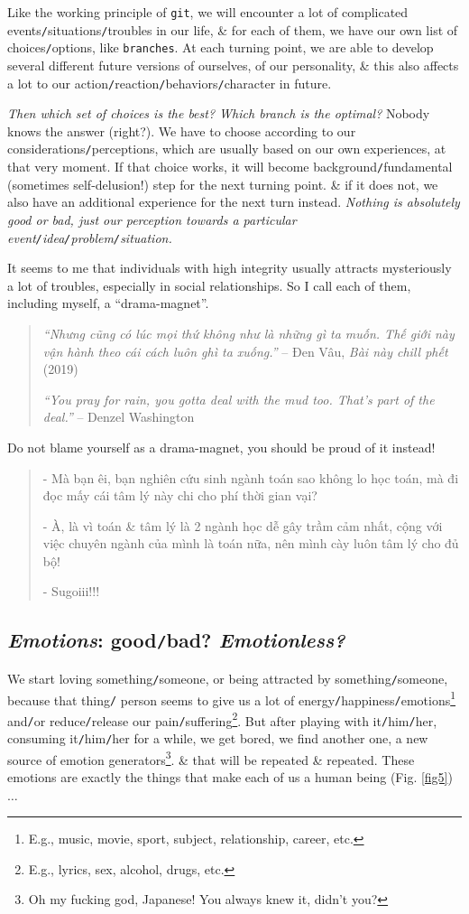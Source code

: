 \documentclass[12pt,oneside]{book}
\begin{document}
Like the working principle of {\tt git}, we will encounter a lot of complicated events{\tt/}situations{\tt/}troubles in our life, \& for each of them, we have our own list of choices{\tt/}options, like {\tt branches}. At each turning point, we are able to develop several different future versions of ourselves, of our personality, \& this also affects a lot to our action{\tt/}reaction{\tt/}behaviors{\tt/}character in future.

{\it Then which set of choices is the best? Which branch is the optimal?} Nobody knows the answer (right?). We have to choose according to our considerations{\tt/}perceptions, which are usually based on our own experiences, at that very moment. If that choice works, it will become background{\tt/}fundamental (sometimes self-delusion!) step for the next turning point. \& if it does not, we also have an additional experience for the next turn instead. {\it Nothing is absolutely good or bad, just our perception towards a particular event{\tt/}idea{\tt/}problem{\tt/}situation.}

It seems to me that individuals with high integrity usually attracts mysteriously a lot of troubles, especially in social relationships. So I call each of them, including myself, a ``drama-magnet''.

\begin{quotation}
	{\it``Nhưng cũng có lúc mọi thứ không như là những gì ta muốn. Thế giới này vận hành theo cái cách luôn ghì ta xuống.''} -- {\sc Đen Vâu}, {\it Bài này chill phết} (2019)
	
	{\it``You pray for rain, you gotta deal with the mud too. That's part of the deal.''} -- {\sc Denzel Washington}
\end{quotation}
Do not blame yourself as a drama-magnet, you should be proud of it instead!
\begin{quote}
	- Mà bạn êi, bạn nghiên cứu sinh ngành toán sao không lo học toán, mà đi đọc mấy cái tâm lý này chi cho phí thời gian vại?
	
	- À, là vì toán \& tâm lý là 2 ngành học dễ gây trầm cảm nhất, cộng với việc chuyên ngành của mình là toán nữa, nên mình cày luôn tâm lý cho đủ bộ!
	
	- Sugoiii!!!
\end{quote}

\subsection{{\it Emotions}: good{\tt/}bad? {\it Emotionless?}}
 We start loving something{\tt/}someone, or being attracted by something{\tt/}someone, because that thing{\tt/} person seems to give us a lot of energy{\tt/}happiness{\tt/}emotions\footnote{E.g., music, movie, sport, subject, relationship, career, etc.} and{\tt/}or reduce{\tt/}release our pain{\tt/}suffering\footnote{E.g., lyrics, sex, alcohol, drugs, etc.}. But after playing with it{\tt/}him{\tt/}her, consuming it{\tt/}him{\tt/}her for a while, we get bored, we find another one, a new source of emotion generators\footnote{Oh my fucking god, Japanese! You always knew it, didn't you?}. \& that will be repeated \& repeated. These emotions are exactly the things that make each of us a human being (Fig. \ref{fig5})$\ldots$
\end{document}
